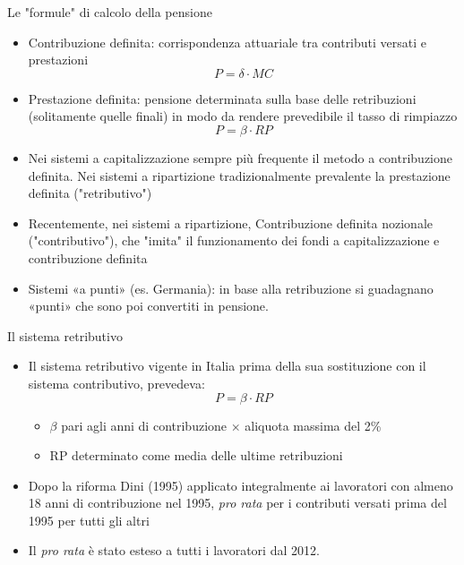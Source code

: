 \documentclass[aspectratio=64,12pt]{beamer}
\begin{document}
\begin{frame}{Le "formule" di calcolo della pensione}
\begin{itemize}
\item \alert{Contribuzione definita}: corrispondenza attuariale tra contributi versati e prestazioni
$$ P = \delta \cdot MC $$
\item \alert{Prestazione definita}: pensione determinata sulla base delle retribuzioni (solitamente quelle finali) in modo da rendere prevedibile il \alert{tasso di rimpiazzo} 
  $$ P = \beta\cdot RP $$
\item Nei sistemi a capitalizzazione sempre più frequente il metodo a contribuzione definita. Nei sistemi a ripartizione tradizionalmente prevalente la prestazione definita ("retributivo")
\item Recentemente, nei sistemi a ripartizione, \alert{Contribuzione definita nozionale}
("contributivo"), che "imita" il funzionamento dei fondi a capitalizzazione
e contribuzione definita
\item \alert{Sistemi «a punti»} (es. Germania): in base alla retribuzione si guadagnano
«punti» che sono poi convertiti in pensione.
\end{itemize}
\end{frame}

\begin{frame}{Il sistema retributivo}
\begin{itemize}
\item Il sistema retributivo vigente in Italia prima della sua sostituzione con il
sistema contributivo, prevedeva:
$$ P = \beta \cdot RP$$
\begin{itemize}
\item $\beta$ pari agli anni di contribuzione $\times$ aliquota massima del 2\%
\item RP determinato come media delle ultime retribuzioni
\end{itemize}
\item Dopo la riforma Dini (1995) applicato integralmente ai lavoratori con almeno
18 anni di contribuzione nel 1995, \emph{pro rata} per i contributi versati
prima del 1995 per tutti gli altri
\item Il \emph{pro rata} è stato esteso a tutti i lavoratori dal 2012.
\end{itemize}
\end{frame}
\end{document}
